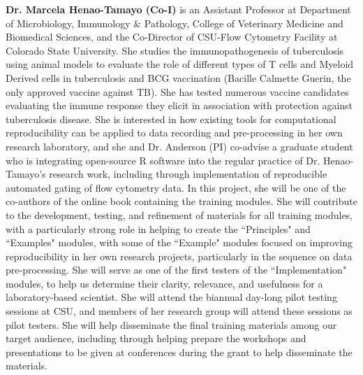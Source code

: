 \documentclass[pdftex,english,11pt,parskip=half]{scrartcl}
\begin{document}
\noindent \textbf{Dr. Marcela Henao-Tamayo (Co-I)} is an Assistant Professor at Department of Microbiology, Immunology \& Pathology, College of Veterinary Medicine and Biomedical Sciences, and the Co-Director of CSU-Flow Cytometry Facility at Colorado State University. She studies the immunopathogenesis of tuberculosis using animal models to evaluate the role of different types of T cells and Myeloid Derived cells in tuberculosis and BCG vaccination (Bacille Calmette Guerin, the only approved vaccine against TB). She has tested numerous vaccine candidates evaluating the immune response they elicit in association with protection against tuberculosis disease. She is interested in how existing tools for computational reproducibility can be applied to data recording and pre-processing in her own research laboratory, and she and Dr. Anderson (PI) co-advise a graduate student who is integrating open-source R software into the regular practice of Dr. Henao-Tamayo's research work, including through implementation of reproducible automated gating of flow cytometry data. In this project, she will be one of the co-authors of the online book containing the training modules. She will contribute to the development, testing, and refinement of materials for all training modules, with a particularly strong role in helping to create the ``Principles" and ``Examples" modules, with some of the ``Example" modules focused on improving reproducibility in her own research projects, particularly in the sequence on data pre-processing. She will serve as one of the first testers of the ``Implementation" modules, to help us determine their clarity, relevance, and usefulness for a laboratory-based scientist. She will attend the biannual day-long pilot testing sessions at CSU, and members of her research group will attend these sessions as pilot testers. She will help disseminate the final training materials among our target audience, including through helping prepare the workshops and presentations to be given at conferences during the grant to help disseminate the materials. 
\end{document}
